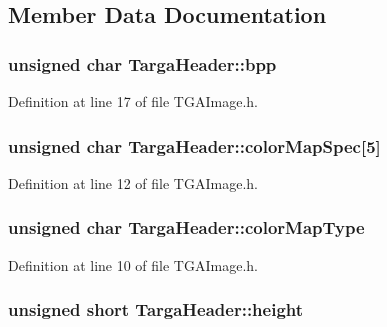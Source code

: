 \subsection{Member Data Documentation}
\hypertarget{struct_targa_header_a808bc7fd8269ba401a755f54d973e803}{
\subsubsection[{bpp}]{\setlength{\rightskip}{0pt plus 5cm}unsigned char Targa\-Header\-::bpp}}\label{struct_targa_header_a808bc7fd8269ba401a755f54d973e803}


Definition at line 17 of file T\-G\-A\-Image.\-h.

\hypertarget{struct_targa_header_a486c82f94722d32eb0c4c2c8344d9714}{
\subsubsection[{color\-Map\-Spec}]{\setlength{\rightskip}{0pt plus 5cm}unsigned char Targa\-Header\-::color\-Map\-Spec\mbox{[}5\mbox{]}}}\label{struct_targa_header_a486c82f94722d32eb0c4c2c8344d9714}


Definition at line 12 of file T\-G\-A\-Image.\-h.

\hypertarget{struct_targa_header_af972cd75dd815e9ca7d1b30d5ded3880}{
\subsubsection[{color\-Map\-Type}]{\setlength{\rightskip}{0pt plus 5cm}unsigned char Targa\-Header\-::color\-Map\-Type}}\label{struct_targa_header_af972cd75dd815e9ca7d1b30d5ded3880}


Definition at line 10 of file T\-G\-A\-Image.\-h.

\hypertarget{struct_targa_header_a480252aac98d30159e726798679c9ee6}{
\subsubsection[{height}]{\setlength{\rightskip}{0pt plus 5cm}unsigned short Targa\-Header\-::height}}\label{struct_targa_header_a480252aac98d30159e726798679c9ee6}


